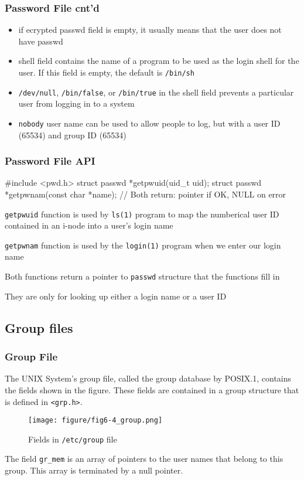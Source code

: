 \documentclass[newPxFont,sthlmFooter,nooffset]{beamer}
\begin{document}
\begin{frame}[t]
  \frametitle{Password File cnt'd}
  \begin{itemize}
  \item if ecrypted passwd field is empty, it usually means that the user does not have passwd
  \item shell field contains the name of a program to be used as the login shell for the user. If this field is empty, the default is \texttt{/bin/sh}
  \item \texttt{/dev/null}, \texttt{/bin/false}, or \texttt{/bin/true} in the shell field prevents a particular user from logging in to a system
  \item \texttt{nobody} user name can be used to allow people to log, but with a user ID (65534) and group ID (65534)
  \end{itemize}
\end{frame}

\begin{frame}[containsverbatim,t]
  \frametitle{Password File API }
\begin{codedef}
#include <pwd.h>
struct passwd *getpwuid(uid_t uid);
struct passwd *getpwnam(const char *name);
// Both return: pointer if OK, NULL on error
\end{codedef}

\texttt{getpwuid} function is used by \texttt{ls(1)} program to map the numberical user ID contained in an i-node into a user's login name

\texttt{getpwnam} function is used by the \texttt{login(1)} program when we enter our login name

Both functions return a pointer to \texttt{passwd} structure that the functions fill in

They are only for looking up either a login name or a user ID
\end{frame}




\subsection{Group files}

\begin{frame}[t]
  \frametitle{Group File}
The UNIX System’s group file, called the group database by POSIX.1, contains the fields shown in the figure. These fields are contained in a group structure that is defined in \texttt{<grp.h>}.



\begin{figure}[h]
  \centering
  \texttt{[image: figure/fig6-4\_group.png]}
  \caption{Fields in \texttt{/etc/group} file}
\end{figure}

The field \texttt{gr\_mem} is an array of pointers to the user names that belong to this group. This array is terminated by a null pointer.

\end{frame}
\end{document}
